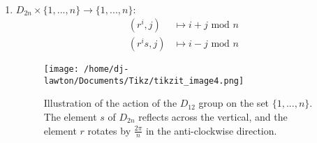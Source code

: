 \documentclass{article}
\begin{document}
\begin{enumerate}
\item $D_{2n}\times\lbrace1,...,n\rbrace\rightarrow\lbrace1,...,n\rbrace:$
\begin{align*}
(r^i,j)&\mapsto i+j \text{ mod }n\\
(r^is,j)&\mapsto i-j\text{ mod }n
\end{align*}
\begin{figure}[H]
\begin{center}
\texttt{[image: /home/dj-lawton/Documents/Tikz/tikzit\_image4.png]}
\caption{\label{fig: Dihedral}Illustration of the action of the $D_{12}$ group on the set $\lbrace 1,...,n\rbrace$. The element $s$ of $D_{2n}$ reflects across the vertical, and the element $r$ rotates by $\frac{2\pi}{n}$ in the anti-clockwise direction. }
\end{center}
\end{figure}

\end{enumerate}
\newpage
\end{document}
